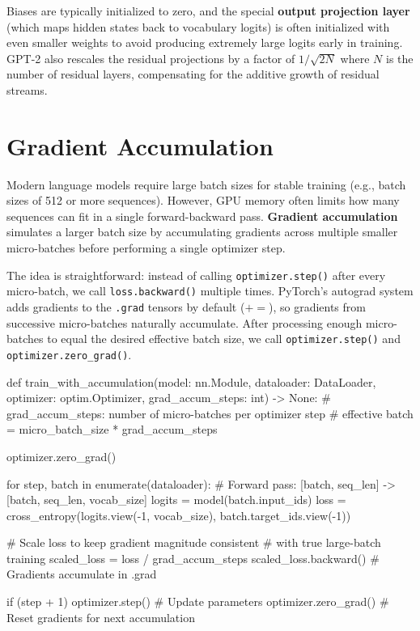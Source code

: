 Biases are typically initialized to zero, and the special \textbf{output projection layer} (which maps hidden states back to vocabulary logits) is often initialized with even smaller weights to avoid producing extremely large logits early in training. GPT-2 also rescales the residual projections by a factor of $1/\sqrt{2N}$ where $N$ is the number of residual layers, compensating for the additive growth of residual streams.

\section{Gradient Accumulation}

Modern language models require large batch sizes for stable training (e.g., batch sizes of 512 or more sequences). However, GPU memory often limits how many sequences can fit in a single forward-backward pass. \textbf{Gradient accumulation} simulates a larger batch size by accumulating gradients across multiple smaller micro-batches before performing a single optimizer step.

The idea is straightforward: instead of calling \texttt{optimizer.step()} after every micro-batch, we call \texttt{loss.backward()} multiple times. PyTorch's autograd system adds gradients to the \texttt{.grad} tensors by default ($+=$), so gradients from successive micro-batches naturally accumulate. After processing enough micro-batches to equal the desired effective batch size, we call \texttt{optimizer.step()} and \texttt{optimizer.zero\_grad()}.

\begin{pseudocode}
def train_with_accumulation(model: nn.Module, dataloader: DataLoader,
                            optimizer: optim.Optimizer,
                            grad_accum_steps: int) -> None:
    # grad_accum_steps: number of micro-batches per optimizer step
    # effective batch = micro_batch_size * grad_accum_steps

    optimizer.zero_grad()

    for step, batch in enumerate(dataloader):
        # Forward pass: [batch, seq_len] -> [batch, seq_len, vocab_size]
        logits = model(batch.input_ids)
        loss = cross_entropy(logits.view(-1, vocab_size),
                             batch.target_ids.view(-1))

        # Scale loss to keep gradient magnitude consistent
        # with true large-batch training
        scaled_loss = loss / grad_accum_steps
        scaled_loss.backward()    # Gradients accumulate in .grad

        if (step + 1) %
            optimizer.step()       # Update parameters
            optimizer.zero_grad()  # Reset gradients for next accumulation
\end{pseudocode}

